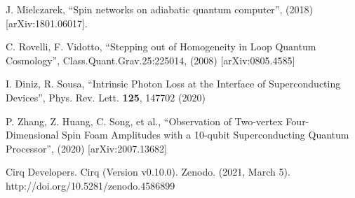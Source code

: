 \documentclass[a4paper,11pt,aps,tightenlines,nofootinbib]{revtex4}
\begin{document}
\begin{thebibliography}{99}
        J. Mielczarek,
        ``Spin networks on adiabatic quantum computer'',
        (2018) [arXiv:1801.06017].


        C. Rovelli, F. Vidotto,
        ``Stepping out of Homogeneity in Loop Quantum Cosmology'',
        Class.Quant.Grav.25:225014, (2008)
        [arXiv:0805.4585]



        I. Diniz, R. Sousa, 
        ``Intrinsic Photon Loss at the Interface of Superconducting Devices'',
        Phys. Rev. Lett. {\bf 125},  147702 (2020)

        
        P. Zhang, Z. Huang, C. Song, et al.,
        ``Observation of Two-vertex Four-Dimensional Spin Foam Amplitudes with a 10-qubit Superconducting Quantum Processor'',
        (2020)
        [arXiv:2007.13682]







        Cirq Developers. 
        Cirq (Version v0.10.0).
        Zenodo.
        (2021, March 5). http://doi.org/10.5281/zenodo.4586899






\end{thebibliography}  
\end{document}
